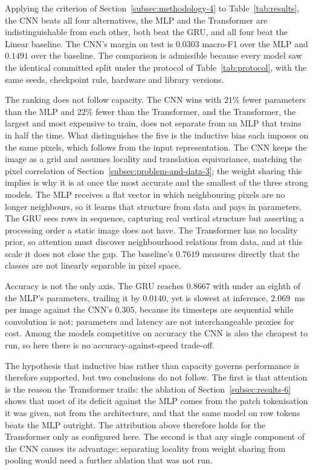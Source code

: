 Applying the criterion of Section~\ref{subsec:methodology-4} to Table~\ref{tab:results}, the CNN
beats all four alternatives, the MLP and the Transformer are indistinguishable from each other,
both beat the GRU, and all four beat the Linear baseline. The CNN's margin on test is $0.0303$
macro-F1 over the MLP and $0.1491$ over the baseline. The comparison is admissible because every
model saw the identical committed split under the protocol of Table~\ref{tab:protocol}, with the
same seeds, checkpoint rule, hardware and library versions.

The ranking does not follow capacity. The CNN wins with $21\%$ fewer parameters than the MLP and
$22\%$ fewer than the Transformer, and the Transformer, the largest and most expensive to train,
does not separate from an MLP that trains in half the time. What distinguishes the five is the
inductive bias each imposes on the same pixels, which follows from the input representation. The
CNN keeps the image as a grid and assumes locality and translation equivariance, matching the
pixel correlation of Section~\ref{subsec:problem-and-data-3}; the weight sharing this implies is
why it is at once the most accurate and the smallest of the three strong models. The MLP receives
a flat vector in which neighbouring pixels are no longer neighbours, so it learns that structure
from data and pays in parameters. The GRU sees rows in sequence, capturing real vertical
structure but asserting a processing order a static image does not have. The Transformer has no
locality prior, so attention must discover neighbourhood relations from data, and at this scale
it does not close the gap. The baseline's $0.7619$ measures directly that the classes are not
linearly separable in pixel space.

Accuracy is not the only axis. The GRU reaches $0.8667$ with under an eighth of the MLP's
parameters, trailing it by $0.0140$, yet is slowest at inference, $2.069$~ms per image against
the CNN's $0.305$, because its timesteps are sequential while convolution is not; parameters and
latency are not interchangeable proxies for cost. Among the models competitive on accuracy the
CNN is also the cheapest to run, so here there is no accuracy-against-speed trade-off.

The hypothesis that inductive bias rather than capacity governs performance is therefore
supported, but two conclusions do not follow. The first is that attention is the reason the
Transformer trails: the ablation of Section~\ref{subsec:results-6} shows that most of its deficit
against the MLP comes from the patch tokenisation it was given, not from the architecture, and
that the same model on row tokens beats the MLP outright. The attribution above therefore holds
for the Transformer only as configured here. The second
is that any single component of the CNN causes its advantage; separating locality from weight
sharing from pooling would need a further ablation that was not run.

